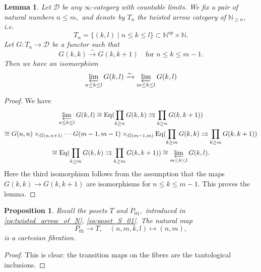 \documentclass[11pt,leqno]{amsart}
\newtheorem{lemma}[theo]{Lemma}
\newtheorem{prop}[theo]{Proposition}
\numberwithin{equation}{section}
\def\N{\mathbb{N}}
\newcommand{\prolim}[1][]{\mathop{\varprojlim}\limits_{#1}}
\newcommand{\prodd}[1][]{\mathop{\prod}\limits_{#1}}
\newcommand{\toto}{\rightrightarrows}
\newcommand{\xto}{\xrightarrow}
\newcommand{\cD}{{\mathcal D}}
\newcommand{\Eq}{\operatorname{Eq}}
\begin{document}
\begin{lemma}\label{lem:trick_with_twisted_arrow_categories}
Let $\cD$ be any $\infty$-category with countable limits. We fix a pair of natural numbers $n\leq m,$ and denote by $T_n$ the twisted arrow category of $\N_{\geq n},$ i.e. 
\begin{equation*}
T_n = \{(k,l)\mid n\leq k\leq l\}\subset \N^{op}\times\N.
\end{equation*}
Let $G:T_n\to\cD$ be a functor such that
\begin{equation*}G(k,k)\xto{\sim}G(k,k+1)\quad \text{for }n\leq k\leq m-1.\end{equation*}
Then we have an isomorphism
\begin{equation*}
\prolim[n\leq k\leq l]G(k,l)\xto{\sim}\prolim[m\leq k\leq l]G(k,l)
\end{equation*}
\end{lemma}

\begin{proof} We have
\begin{multline*}
\prolim[n\leq k\leq l]G(k,l)\cong \Eq(\prodd[k\geq n]G(k,k)\toto \prodd[k\geq n]G(k,k+1))\\
\cong G(n,n)\times_{G(n,n+1)}\cdots G(m-1,m-1)\times_{G(m-1,m)}\Eq(\prodd[k\geq m]G(k,k)\toto \prodd[k\geq m]G(k,k+1))\\
\cong\Eq(\prodd[k\geq m]G(k,k)\toto \prodd[k\geq m]G(k,k+1))\cong \prolim[m\leq k\leq l]G(k,l).
\end{multline*} 
Here the third isomorphism follows from the assumption that the maps $G(k,k)\to G(k,k+1)$ are isomorphisms for $n\leq k\leq m-1.$ This proves the lemma.
\end{proof}

\begin{prop}\label{prop:projection_is_a_fibration}
Recall the posets $T$ and $P_{01},$ introduced in \eqref{eq:twisted_arrow_of_N}, \eqref{eq:poset_S_01}. The natural map 
\begin{equation*}
P_{01}\to T,\quad (n,m,k,l)\mapsto (n,m),
\end{equation*}
is a cartesian fibration.
\end{prop}

\begin{proof}
This is clear: the transition maps on the fibers are the tautological inclusions.
\end{proof}
\end{document}
